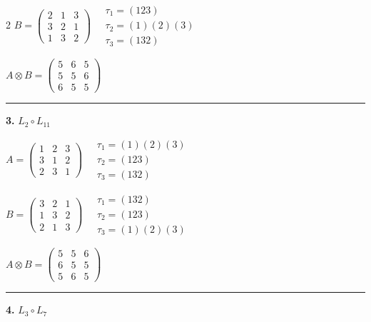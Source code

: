\begin{multicols}{2}
$B = \begin{pmatrix} 2 & 1 & 3 \\ 3 & 2 & 1 \\ 1 & 3 & 2 \end{pmatrix} \quad \begin{matrix} \tau_{1}=(1 2 3) \\ \tau_{2}=(1)(2)(3) \\ \tau_{3}=(1 3 2) \end{matrix}$

$A \otimes B = \begin{pmatrix} 5 & 6 & 5 \\ 5 & 5 & 6 \\ 6 & 5 & 5 \end{pmatrix}$

\vspace{0.3em}
\hrule
\vspace{0.3em}

\noindent\textbf{3.} $L_{2} \circ L_{11}$

$A = \begin{pmatrix} 1 & 2 & 3 \\ 3 & 1 & 2 \\ 2 & 3 & 1 \end{pmatrix} \quad \begin{matrix} \tau_{1}=(1)(2)(3) \\ \tau_{2}=(1 2 3) \\ \tau_{3}=(1 3 2) \end{matrix}$

$B = \begin{pmatrix} 3 & 2 & 1 \\ 1 & 3 & 2 \\ 2 & 1 & 3 \end{pmatrix} \quad \begin{matrix} \tau_{1}=(1 3 2) \\ \tau_{2}=(1 2 3) \\ \tau_{3}=(1)(2)(3) \end{matrix}$

$A \otimes B = \begin{pmatrix} 5 & 5 & 6 \\ 6 & 5 & 5 \\ 5 & 6 & 5 \end{pmatrix}$

\vspace{0.3em}
\hrule
\vspace{0.3em}

\noindent\textbf{4.} $L_{3} \circ L_{7}$


\end{multicols}

